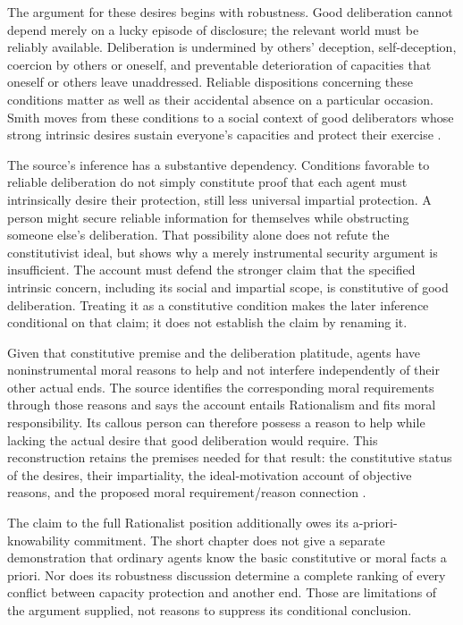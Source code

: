 The argument for these desires begins with robustness. Good deliberation
cannot depend merely on a lucky episode of disclosure; the relevant
world must be reliably available. Deliberation is undermined by others'
deception, self-deception, coercion by others or oneself, and preventable
deterioration of capacities that oneself or others leave unaddressed.
Reliable dispositions concerning these conditions matter as well as
their accidental absence on a particular occasion. Smith moves from
these conditions to a social context of good deliberators whose strong
intrinsic desires sustain everyone's capacities and protect their exercise
\parencite[p.~699]{Smith2021MoralReasons}.

The source's inference has a substantive dependency. Conditions favorable
to reliable deliberation do not simply constitute proof that each agent
must intrinsically desire their protection, still less universal impartial
protection. A person might secure reliable information for themselves
while obstructing someone else's deliberation. That possibility alone
does not refute the constitutivist ideal, but shows why a merely
instrumental security argument is insufficient. The account must defend
the stronger claim that the specified intrinsic concern, including its
social and impartial scope, is constitutive of good deliberation.
Treating it as a constitutive condition makes the later inference
conditional on that claim; it does not establish the claim by renaming it.

Given that constitutive premise and the deliberation platitude, agents
have noninstrumental moral reasons to help and not interfere independently
of their other actual ends. The source identifies the corresponding
moral requirements through those reasons and says the account entails
Rationalism and fits moral responsibility. Its callous person can
therefore possess a reason to help while lacking the actual desire that
good deliberation would require. This reconstruction retains the
premises needed for that result: the constitutive status of the desires,
their impartiality, the ideal-motivation account of objective reasons,
and the proposed moral requirement/reason connection
\parencite[pp.~699--700]{Smith2021MoralReasons}.

The claim to the full Rationalist position additionally owes its
a-priori-knowability commitment. The short chapter does not give a
separate demonstration that ordinary agents know the basic constitutive
or moral facts a priori. Nor does its robustness discussion determine
a complete ranking of every conflict between capacity protection and
another end. Those are limitations of the argument supplied, not
reasons to suppress its conditional conclusion.

